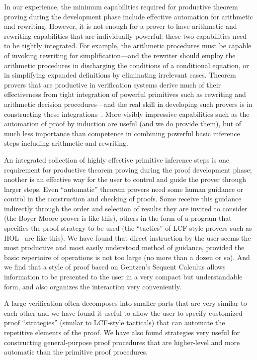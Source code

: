 In our experience, the minimum capabilities required for productive
theorem proving during the development phase include effective
automation for arithmetic and rewriting.  However, it is not enough
for a prover to have arithmetic and rewriting capabilities that are
individually powerful: these two capabilities need to be tightly
integrated.  For example, the arithmetic procedures must be capable
of invoking rewriting for simplification---and the rewriter should
employ the arithmetic procedures in discharging the conditions of a
conditional equation, or in simplifying expanded definitions by
eliminating irrelevant cases.  Theorem provers that are productive in
verification systems derive much of their effectiveness from tight
integration of powerful primitives such as rewriting and arithmetic
decision procedures---and the real skill in developing such provers
is in constructing these integrations~\cite{Boyer&Moore:linear}.
More visibly impressive capabilities such as the automation of proof
by induction are useful (and we do provide them), but of much less
importance than competence in combining powerful basic inference
steps including arithmetic and rewriting.

An integrated collection of highly effective primitive inference
steps is one requirement for productive theorem proving during the
proof development phase; another is an effective way for the user to
control and guide the prover through larger steps.  Even
``automatic'' theorem provers need some human guidance or control in
the construction and checking of proofs.  Some receive this guidance
indirectly through the order and selection of results they are invited to
consider (the Boyer-Moore prover is like this), others in the form of a
program that specifies the proof strategy to be used (the ``tactics''
of LCF-style provers such as HOL~\cite{Gordon&Melham:HOL} are like
this).  We have found that direct instruction by the user seems the
most productive and most easily understood method of guidance,
provided the basic repertoire of operations is not too large (no more
than a dozen or so).  And we find that a style of proof based on
Gentzen's Sequent Calculus allows information to be presented to the
user in a very compact but understandable form, and also organizes
the interaction very conveniently.

A large verification often decomposes into smaller parts that are
very similar to each other and we have found it useful to allow the user
to specify customized proof ``strategies'' (similar to LCF-style
tacticals) that can automate the repetitive elements of the proof.
We have also found strategies very useful for constructing
general-purpose proof procedures that are higher-level and more
automatic than the primitive proof procedures.

